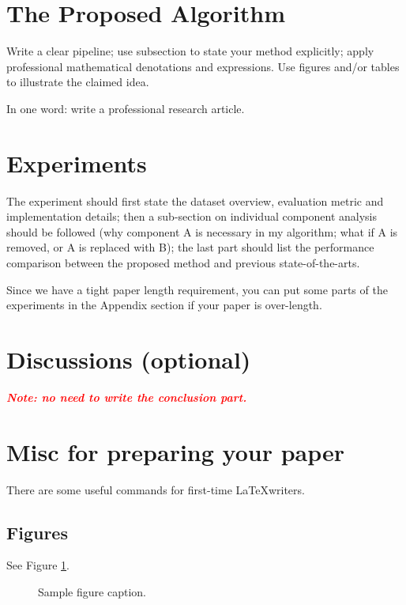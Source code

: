 \documentclass{article}
\begin{document}
\section{The Proposed Algorithm}

Write a clear pipeline; use subsection to state your method explicitly; apply professional mathematical denotations and expressions. Use figures and/or tables to illustrate the claimed idea.

In one word: write a professional research article.

\section{Experiments}

The experiment should first state the dataset overview, evaluation metric and implementation details; then a sub-section on individual component analysis should be followed (why component A is necessary in my algorithm; what if A is removed, or A is replaced with B); the last part should list the performance comparison between the proposed method and previous state-of-the-arts.

Since we have a tight paper length requirement, you can put some parts of the experiments in the Appendix section if your paper is over-length.

\section{Discussions (optional)}

\textcolor{red}{\textit{\textbf{Note: no need to write the conclusion part.}}}

\section{Misc for preparing your paper}

There are some useful commands for first-time \LaTeX writers.

\subsection{Figures}

See Figure \ref{figure_sample}.
\begin{figure}[h]
  \centering
  \fbox{\rule[-.5cm]{0cm}{4cm} \rule[-.5cm]{4cm}{0cm}}
  \caption{Sample figure caption.}\label{figure_sample}
\end{figure}
\end{document}
